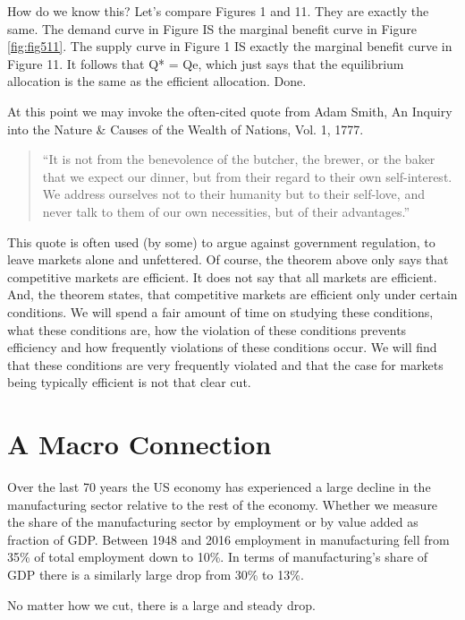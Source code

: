\documentclass[
]{book}
\begin{document}
How do we know this? Let's compare Figures 1 and 11. They are exactly the same. The demand curve in Figure IS the marginal benefit curve in Figure \ref{fig:fig511}. The supply curve in Figure 1 IS exactly the marginal benefit curve in Figure 11. It follows that Q* = Qe, which just says that the equilibrium allocation is the same as the efficient allocation. Done.

At this point we may invoke the often-cited quote from Adam Smith, An Inquiry into the Nature \& Causes of the Wealth of Nations, Vol. 1, 1777.

\begin{quote}
``It is not from the benevolence of the butcher, the brewer, or the baker that we expect our dinner, but from their regard to their own self-interest. We address ourselves not to their humanity but to their self-love, and never talk to them of our own necessities, but of their advantages.''
\end{quote}

This quote is often used (by some) to argue against government regulation, to leave markets alone and unfettered. Of course, the theorem above only says that competitive markets are efficient. It does not say that all markets are efficient. And, the theorem states, that competitive markets are efficient only under certain conditions. We will spend a fair amount of time on studying these conditions, what these conditions are, how the violation of these conditions prevents efficiency and how frequently violations of these conditions occur. We will find that these conditions are very frequently violated and that the case for markets being typically efficient is not that clear cut.

\hypertarget{a-macro-connection}{%
\section{A Macro Connection}\label{a-macro-connection}}

Over the last 70 years the US economy has experienced a large decline in the manufacturing sector relative to the rest of the economy. Whether we measure the share of the manufacturing sector by employment or by value added as fraction of GDP. Between 1948 and 2016 employment in manufacturing fell from 35\% of total employment down to 10\%. In terms of manufacturing's share of GDP there is a similarly large drop from 30\% to 13\%.

No matter how we cut, there is a large and steady drop.
\end{document}
